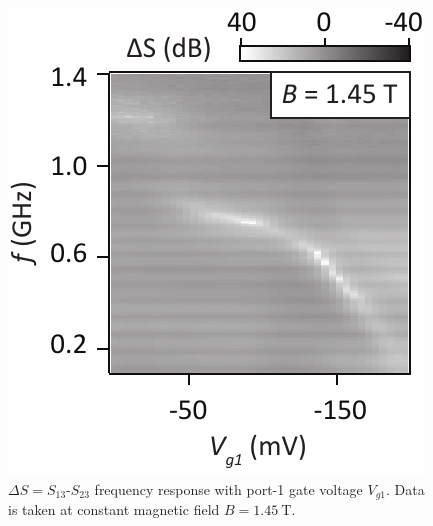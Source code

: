 \vfill
\begin{figure}[ht]
\includegraphics[scale=0.7]{Sfig4_2.pdf}
\caption[Frequency response with gate voltage]{$\Delta S = S_{13}$-$S_{23}$ frequency response with port-1 gate voltage $V_{g1}$. Data is taken at constant magnetic field $B = \SI{1.45}{\tesla}$.}
\label{fig:qhe_s4}
\end{figure}
\vfill
